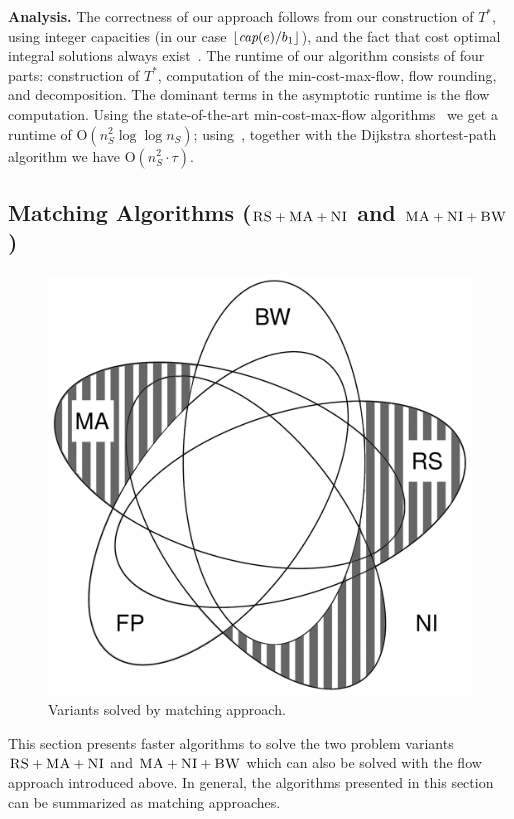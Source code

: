 \documentclass[9pt]{sigcomm-alternate}
\newcommand{\capacity}{\emph{cap}}
\newcommand{\CC}{\textsc{NI}}
\newcommand{\RS}{\textsc{RS}}
\newcommand{\BW}{\textsc{BW}}
\newcommand{\MA}{\textsc{MA}}
\newcommand{\Tree}{\ensuremath{T}}
\newcommand{\CostTrans}{\ensuremath{b_1}}
\begin{document}
\textbf{Analysis.}
The correctness of our approach follows from our construction
of $\Tree^*$, using integer capacities (in our case $\lfloor\capacity(e)/\CostTrans\rfloor$),
and the fact that cost optimal integral solutions always exist~\cite{flow-book}.
The runtime of our algorithm consists of four parts: construction of $\Tree^*$,
computation of the min-cost-max-flow, flow rounding, and decomposition. The
dominant terms in the asymptotic runtime is the flow computation.
Using the state-of-the-art min-cost-max-flow algorithms~\cite{mincostmaxflow-1,mincostmaxflow-2}
we get a runtime of $\mathrm{O}(n_S^2 \log\log n_S)$;
using~\cite{successive_shortest_path_complexity},
together with the Dijkstra shortest-path algorithm we have $\mathrm{O}(n_S^2\cdot \tau)$.


\subsection{Matching Algorithms ($\RS+\MA+\CC$ and $\MA+\CC+\BW$)}\label{ssec:match}

\begin{figure}
\includegraphics[width=0.48\columnwidth]{figs/venn_matching.pdf}
\caption{Variants solved by matching approach.}
\label{fig:venn_match}
\end{figure}

This section presents faster algorithms to solve the two problem variants
$\RS+\MA+\CC$ and $\MA+\CC+\BW$ which can also be solved with the flow approach
introduced above. 
In general, the algorithms presented in this section can be summarized
as matching approaches.
\end{document}
